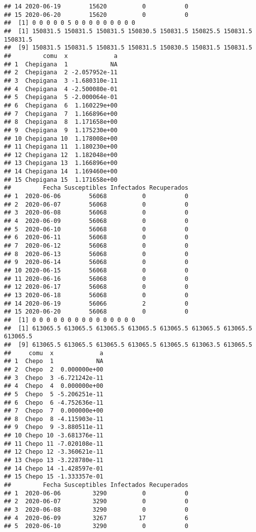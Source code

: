 \documentclass[
]{article}
\begin{document}
\begin{verbatim}
## 14 2020-06-19        15620          0           0
## 15 2020-06-20        15620          0           0
##  [1] 0 0 0 0 0 5 0 0 0 0 0 0 0 0 0
##  [1] 150831.5 150831.5 150831.5 150830.5 150831.5 150825.5 150831.5 150831.5
##  [9] 150831.5 150831.5 150831.5 150831.5 150830.5 150831.5 150831.5
##         comu  x             a
## 1  Chepigana  1            NA
## 2  Chepigana  2 -2.057952e-11
## 3  Chepigana  3 -1.680310e-11
## 4  Chepigana  4 -2.500080e-01
## 5  Chepigana  5 -2.000064e-01
## 6  Chepigana  6  1.160229e+00
## 7  Chepigana  7  1.166896e+00
## 8  Chepigana  8  1.171658e+00
## 9  Chepigana  9  1.175230e+00
## 10 Chepigana 10  1.178008e+00
## 11 Chepigana 11  1.180230e+00
## 12 Chepigana 12  1.182048e+00
## 13 Chepigana 13  1.166896e+00
## 14 Chepigana 14  1.169460e+00
## 15 Chepigana 15  1.171658e+00
##         Fecha Susceptibles Infectados Recuperados
## 1  2020-06-06        56068          0           0
## 2  2020-06-07        56068          0           0
## 3  2020-06-08        56068          0           0
## 4  2020-06-09        56068          0           0
## 5  2020-06-10        56068          0           0
## 6  2020-06-11        56068          0           0
## 7  2020-06-12        56068          0           0
## 8  2020-06-13        56068          0           0
## 9  2020-06-14        56068          0           0
## 10 2020-06-15        56068          0           0
## 11 2020-06-16        56068          0           0
## 12 2020-06-17        56068          0           0
## 13 2020-06-18        56068          0           0
## 14 2020-06-19        56066          2           0
## 15 2020-06-20        56068          0           0
##  [1] 0 0 0 0 0 0 0 0 0 0 0 0 0 0 0
##  [1] 613065.5 613065.5 613065.5 613065.5 613065.5 613065.5 613065.5 613065.5
##  [9] 613065.5 613065.5 613065.5 613065.5 613065.5 613063.5 613065.5
##     comu  x             a
## 1  Chepo  1            NA
## 2  Chepo  2  0.000000e+00
## 3  Chepo  3 -6.721242e-11
## 4  Chepo  4  0.000000e+00
## 5  Chepo  5 -5.206251e-11
## 6  Chepo  6 -4.752636e-11
## 7  Chepo  7  0.000000e+00
## 8  Chepo  8 -4.115903e-11
## 9  Chepo  9 -3.880511e-11
## 10 Chepo 10 -3.681376e-11
## 11 Chepo 11 -7.020108e-11
## 12 Chepo 12 -3.360621e-11
## 13 Chepo 13 -3.228780e-11
## 14 Chepo 14 -1.428597e-01
## 15 Chepo 15 -1.333357e-01
##         Fecha Susceptibles Infectados Recuperados
## 1  2020-06-06         3290          0           0
## 2  2020-06-07         3290          0           0
## 3  2020-06-08         3290          0           0
## 4  2020-06-09         3267         17           6
## 5  2020-06-10         3290          0           0

\end{verbatim}
\end{document}
